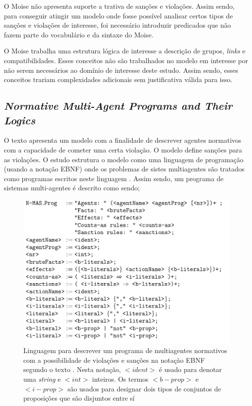 \documentclass[12pt]{article}
\begin{document}
O Moise não apresenta suporte a trativa de sanções e violações. Assim sendo, para conseguir atingir um modelo onde fosse possível analisar certos tipos de sanções e violações de interesse, foi necessário introduzir predicados que não fazem parte do vocabulário e da sintaxe do Moise. 

O Moise trabalha uma estrutura lógica de interesse a descrição de grupos, \textit{links} e compatibilidades. Esses conceitos não são trabalhados no modelo em interesse por não serem necessários ao domínio de interesse deste estudo. Assim sendo, esses conceitos trariam complexidades adicionais sem justificativa válida para isso.


\subsection{\textit{Normative Multi-Agent Programs and Their Logics}}

O texto \cite{dastaniNormativeMultiAgentProgram} apresenta um modelo com a finalidade de descrever agentes normativos com a capacidade de cometer uma certa violação. O modelo define sanções para as violações. O estudo estrutura o modelo como uma linguagem de programação (usando a notação EBNF) onde os problemas de sistes multiagentes são tratados como programas escritos neste linguagem \cite{dastaniNormativeMultiAgentProgram}. Assim sendo, um programa de sistemas multi-agentes é descrito como sendo; 


\begin{figure}[H]
  \centering
  \includegraphics[width=0.8\linewidth]{masprogram.png} 
  \caption{Linguagem para descrever um programa de multiagentes normativos com a possibilidade de violações e sanções na notação EBNF segundo o texto \cite{dastaniNormativeMultiAgentProgram}. Nesta notação, $<ident>$ é usado para denotar uma \textit{string} e $<int>$ inteiros. Os termos $<b-prop>$ e $<i-prop>$ são usados para designar dois tipos de conjuntos de proposições que são disjuntos entre sí}
  \label{descreveprograma}
\end{figure}
\end{document}
